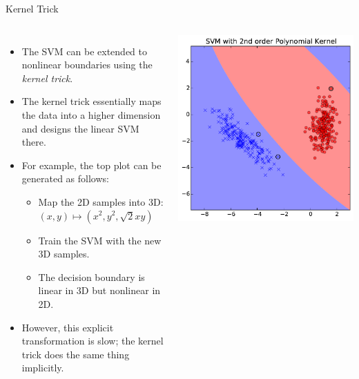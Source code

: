 \documentclass[10pt, aspectratio=169]{beamer} %
\begin{document}
\begin{frame}[fragile,allowframebreaks=0.8]
 {Kernel Trick}
\begin{columns}[onlytextwidth]
\begin{itemize}
\item The SVM can be extended to nonlinear boundaries using the \textit{kernel trick}.
\item The kernel trick essentially maps the data into a higher dimension and designs the linear SVM there.
\item For example, the top plot can be generated as follows:
\begin{itemize}
\item Map the 2D samples into 3D: $(x,y) \mapsto (x^2, y^2, \sqrt{2}x y)$
\item Train the SVM with the new 3D samples.
\item The decision boundary is linear in 3D but nonlinear in 2D.
\end{itemize}
\item However, this explicit transformation is slow; the kernel trick does the same thing
implicitly.
\end{itemize}
\includegraphics[width=\columnwidth]{SVM_boundary_poly2.pdf}\\

\end{columns}
\end{frame}
\end{document}
